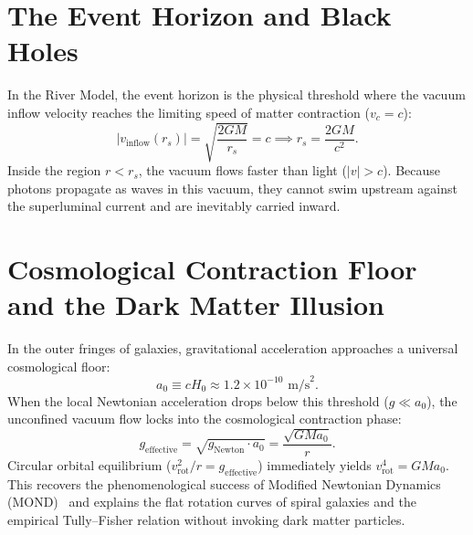 \documentclass[11pt,a4paper]{article}
\begin{document}
\section{The Event Horizon and Black Holes}
\label{sec:karadelikler}

In the River Model, the event horizon is the physical threshold where the vacuum inflow velocity reaches the limiting speed of matter contraction ($v_c = c$):
\begin{equation}
    |v_{\mathrm{inflow}}(r_s)| = \sqrt{\frac{2GM}{r_s}} = c \implies r_s = \frac{2GM}{c^2}.
    \label{eq:ufuk_yaricap}
\end{equation}
Inside the region $r < r_s$, the vacuum flows faster than light ($|v| > c$). Because photons propagate as waves in this vacuum, they cannot swim upstream against the superluminal current and are inevitably carried inward.

\section{Cosmological Contraction Floor and the Dark Matter Illusion}
\label{sec:karanlik_madde}

In the outer fringes of galaxies, gravitational acceleration approaches a universal cosmological floor:
\begin{equation}
    a_0 \equiv c H_0 \approx 1.2 \times 10^{-10}\text{ m/s}^2.
    \label{eq:a0_esik}
\end{equation}
When the local Newtonian acceleration drops below this threshold ($g \ll a_0$), the unconfined vacuum flow locks into the cosmological contraction phase:
\begin{equation}
    g_{\mathrm{effective}} = \sqrt{g_{\mathrm{Newton}} \cdot a_0} = \frac{\sqrt{GM a_0}}{r}.
    \label{eq:mond_limit}
\end{equation}
Circular orbital equilibrium ($v_{\mathrm{rot}}^2 / r = g_{\mathrm{effective}}$) immediately yields $v_{\mathrm{rot}}^4 = G M a_0$. This recovers the phenomenological success of Modified Newtonian Dynamics (MOND)~\cite{milgrom1983} and explains the flat rotation curves of spiral galaxies and the empirical Tully--Fisher relation without invoking dark matter particles.
\end{document}
